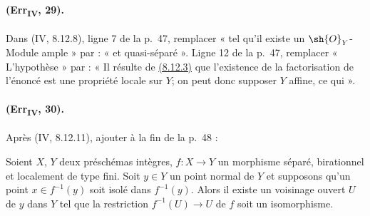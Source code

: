 \paragraph{(Err\textsubscript{IV}, 29).}
Dans (IV, 8.12.8), ligne 7 de la p.~47, remplacer « tel qu'il existe un
$\sh{O}_Y$-Module ample » par : « et quasi-séparé ». Ligne 12 de la
p.~47, remplacer « L'hypothèse » par : « Il résulte de
{\hyperref[canon-index.ega4.c04.prop.8-12-3]{(8.12.3)}} que l'existence de la
factorisation de l'énoncé est une propriété locale sur $Y$; on peut
donc supposer $Y$ affine, ce qui ».

\paragraph{(Err\textsubscript{IV}, 30).}
Après (IV, 8.12.11), ajouter à la fin de la p.~48 :

\begin{corollary}[8.12.12]
Soient $X$, $Y$ deux préschémas intègres,
$f:X\to Y$ un morphisme séparé, birationnel et localement de type fini.
Soit $y\in Y$ un point normal de $Y$ et supposons qu'un point
$x\in f^{-1}(y)$ soit isolé dans $f^{-1}(y)$. Alors il existe un
voisinage ouvert $U$ de $y$ dans $Y$ tel que la restriction
$f^{-1}(U)\to U$ de $f$ soit un isomorphisme.
\end{corollary}

